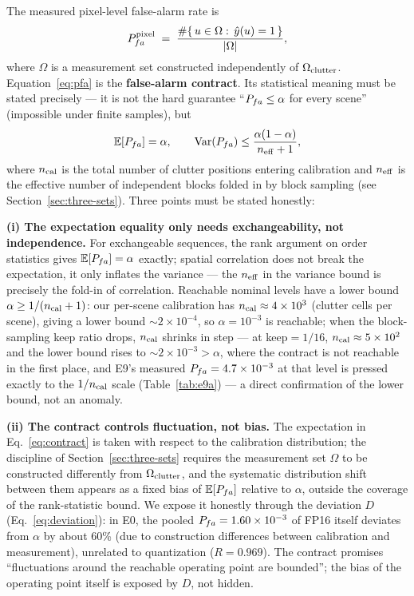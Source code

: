 The measured pixel-level false-alarm rate is
\begin{equation}
P_{fa}^{\mathrm{pixel}} \;=\; \frac{\#\{\,u\in\Omega:\,\hat{y}(u)=1\,\}}{|\Omega|},
\label{eq:pfa}
\end{equation}
where $\Omega$ is a measurement set constructed independently of $\Omega_{\mathrm{clutter}}$.
Equation~\eqref{eq:pfa} is the \textbf{false-alarm contract}.
Its statistical meaning must be stated precisely --- it is not the hard guarantee ``$P_{fa}\le\alpha$ for every scene'' (impossible under finite samples), but
\begin{equation}
\mathbb{E}[P_{fa}]=\alpha,\qquad
\mathrm{Var}(P_{fa})\le \frac{\alpha(1-\alpha)}{n_{\mathrm{eff}}+1},
\label{eq:contract}
\end{equation}
where $n_{\mathrm{cal}}$ is the total number of clutter positions entering calibration and $n_{\mathrm{eff}}$ is the effective number of independent blocks folded in by block sampling (see Section~\ref{sec:three-sets}).
Three points must be stated honestly:

\textbf{(i) The expectation equality only needs exchangeability, not independence.}
For exchangeable sequences, the rank argument on order statistics gives $\mathbb{E}[P_{fa}]=\alpha$ exactly; spatial correlation does not break the expectation, it only inflates the variance --- the $n_{\mathrm{eff}}$ in the variance bound is precisely the fold-in of correlation.
Reachable nominal levels have a lower bound $\alpha\ge 1/(n_{\mathrm{cal}}+1)$: our per-scene calibration has $n_{\mathrm{cal}}\approx4\times10^{3}$ (clutter cells per scene), giving a lower bound $\sim2\times10^{-4}$, so $\alpha=10^{-3}$ is reachable; when the block-sampling keep ratio drops, $n_{\mathrm{cal}}$ shrinks in step --- at keep$=1/16$, $n_{\mathrm{cal}}\approx5\times10^{2}$ and the lower bound rises to $\sim2\times10^{-3}>\alpha$, where the contract is not reachable in the first place, and E9's measured $P_{fa}=4.7\times10^{-3}$ at that level is pressed exactly to the $1/n_{\mathrm{cal}}$ scale (Table~\ref{tab:e9a}) --- a direct confirmation of the lower bound, not an anomaly.

\textbf{(ii) The contract controls fluctuation, not bias.}
The expectation in Eq.~\eqref{eq:contract} is taken with respect to the calibration distribution; the discipline of Section~\ref{sec:three-sets} requires the measurement set $\Omega$ to be constructed differently from $\Omega_{\mathrm{clutter}}$, and the systematic distribution shift between them appears as a fixed bias of $\mathbb{E}[P_{fa}]$ relative to $\alpha$, outside the coverage of the rank-statistic bound.
We expose it honestly through the deviation $D$ (Eq.~\eqref{eq:deviation}): in E0, the pooled $P_{fa}=1.60\times10^{-3}$ of FP16 itself deviates from $\alpha$ by about 60\% (due to construction differences between calibration and measurement), unrelated to quantization ($R=0.969$).
The contract promises ``fluctuations around the reachable operating point are bounded''; the bias of the operating point itself is exposed by $D$, not hidden.

